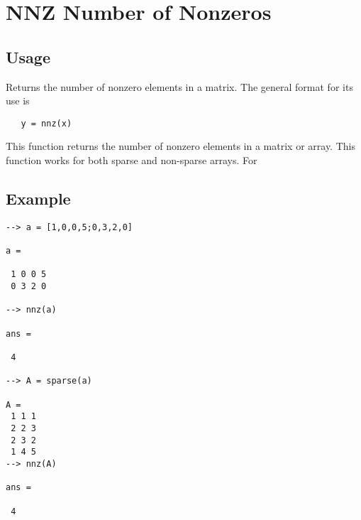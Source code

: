 \section{NNZ Number of Nonzeros
}

\subsection{Usage}

Returns the number of nonzero elements in a matrix.
The general format for its use is
\begin{verbatim}
   y = nnz(x)
\end{verbatim}
This function returns the number of nonzero elements
in a matrix or array.  This function works for both
sparse and non-sparse arrays.  For 
\subsection{Example}

\begin{verbatim}
--> a = [1,0,0,5;0,3,2,0]

a = 

 1 0 0 5 
 0 3 2 0 

--> nnz(a)

ans = 

 4 

--> A = sparse(a)

A = 
 1 1 1
 2 2 3
 2 3 2
 1 4 5
--> nnz(A)

ans = 

 4 
\end{verbatim}
